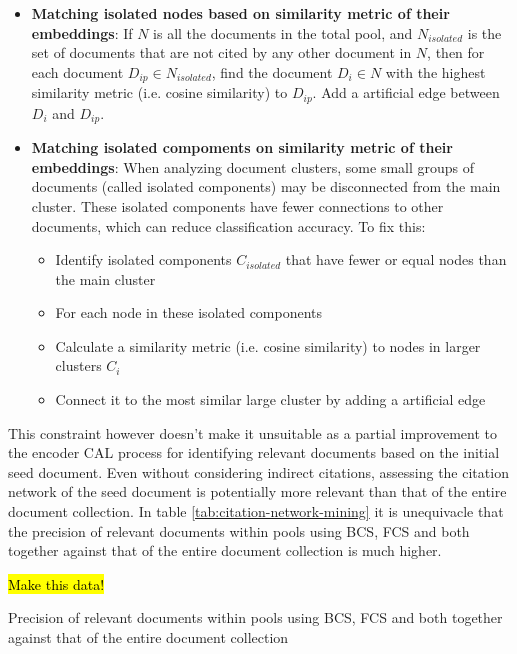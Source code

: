 \documentclass[../main.tex]{subfiles}
\begin{document}
\begin{itemize}
    \item \textbf{Matching isolated nodes based on similarity metric of their embeddings}: If $N$ is all the documents in the total pool, and $N_{isolated}$ is the set of documents that are not cited by any other document in $N$, then for each document $D_{ip} \in N_{isolated}$, find the document $D_i \in N$ with the highest similarity metric (i.e. cosine similarity) to $D_{ip}$. Add a artificial edge between $D_i$ and $D_{ip}$.
    \item \textbf{Matching isolated compoments on similarity metric of their embeddings}: When analyzing document clusters, some small groups of documents (called isolated components) may be disconnected from the main cluster. These isolated components have fewer connections to other documents, which can reduce classification accuracy. To fix this:
    \begin{itemize}
        \item Identify isolated components $C_{isolated}$ that have fewer or equal nodes than the main cluster
        \item For each node in these isolated components
        \item Calculate a similarity metric (i.e. cosine similarity) to nodes in larger clusters $C_i$
        \item Connect it to the most similar large cluster by adding a artificial edge
    \end{itemize}

\end{itemize}

This constraint however doesn't make it unsuitable as a partial improvement to the encoder CAL process for identifying relevant documents based on the initial seed document. Even without considering indirect citations, assessing the citation network of the seed document is potentially more relevant than that of the entire document collection. In table \ref{tab:citation-network-mining} it is unequivacle that the precision of relevant documents within pools using BCS, FCS  and both together against that of the entire document collection is much higher.

\hl{Make this data!}

\begin{table}[h]
    \centering
    \caption{Precision of relevant documents within pools using BCS, FCS and both together against that of the entire document collection}
    \label{tab:citation-network-mining}
\end{table}
\end{document}
